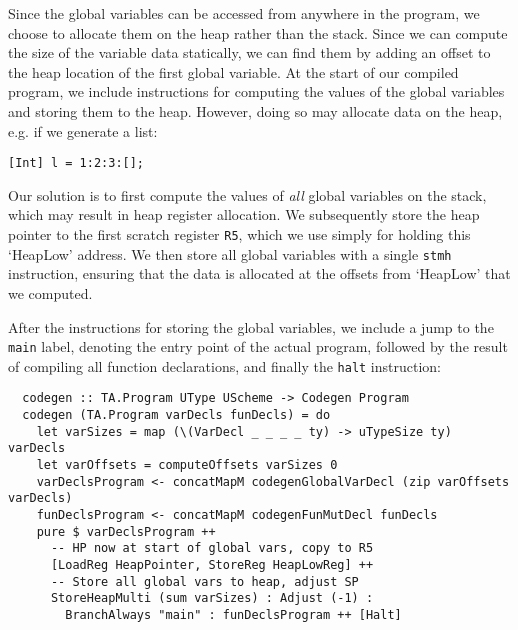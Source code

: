 Since the global variables can be accessed from anywhere in the program, we
choose to allocate them on the heap rather than the stack. Since we can compute
the size of the variable data statically, we can find them by adding an offset
to the heap location of the first global variable.
At the start of our compiled program, we include instructions for computing the
values of the global variables and storing them to the heap.
However, doing so may allocate data on the heap, e.g. if we generate a list:
\begin{lstlisting}[language=spl]
  [Int] l = 1:2:3:[];
\end{lstlisting}
%
Our solution is to first compute the values of \emph{all} global variables on
the stack, which may result in heap register allocation. We subsequently store
the heap pointer to the first scratch register \texttt{R5}, which we use simply
for holding this `HeapLow' address. We then store all global variables with a
single \texttt{stmh} instruction, ensuring that the data is allocated at the
offsets from `HeapLow' that we computed.

After the instructions for storing the global variables, we include a jump to
the \texttt{main} label, denoting the entry point of the actual program,
followed by the result of compiling all function declarations, and finally the
\texttt{halt} instruction:
%
\begin{verbatim}
  codegen :: TA.Program UType UScheme -> Codegen Program
  codegen (TA.Program varDecls funDecls) = do
    let varSizes = map (\(VarDecl _ _ _ _ ty) -> uTypeSize ty) varDecls
    let varOffsets = computeOffsets varSizes 0
    varDeclsProgram <- concatMapM codegenGlobalVarDecl (zip varOffsets varDecls)
    funDeclsProgram <- concatMapM codegenFunMutDecl funDecls
    pure $ varDeclsProgram ++
      -- HP now at start of global vars, copy to R5
      [LoadReg HeapPointer, StoreReg HeapLowReg] ++
      -- Store all global vars to heap, adjust SP
      StoreHeapMulti (sum varSizes) : Adjust (-1) :
        BranchAlways "main" : funDeclsProgram ++ [Halt]
\end{verbatim}



